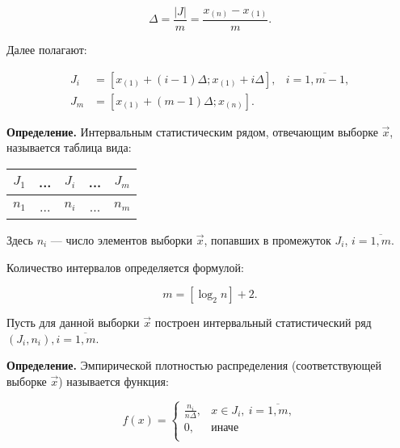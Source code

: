\begin{equation}\label{eq:06}
    \Delta = \frac{|J|}{m} = \frac{x_{(n)} - x_{(1)}}{m}.
\end{equation}

\clearpage
Далее полагают:

\begin{equation}\label{eq:07}
    \begin{aligned}
        J_i &= [x_{(1)} + (i - 1) \Delta; x_{(1)} + i \Delta],
        & i = \overline{1, m-1},\\
        J_m &= [x_{(1)} + (m - 1) \Delta; x_{(n)}].
    \end{aligned}
\end{equation}

\textbf{Определение.} Интервальным статистическим рядом, отвечающим
выборке $\vec{x}$, называется таблица вида:

\begin{table}[htb]
    \centering
    \begin{tabular}{|c|c|c|c|c|}
        \hline
        $J_1$ & ... & $J_i$ & ... & $J_m$ \\
        \hline
        $n_1$ & ... & $n_i$ & ... & $n_m$ \\
        \hline
    \end{tabular}
\end{table}

Здесь $n_i$ --- число элементов выборки $\vec{x}$, попавших в промежуток $J_i$,
$i= \overline{1,m}$.

Количество интервалов определяется формулой:

\begin{equation}\label{eq:09}
    m = [\log_2 n] + 2.
\end{equation}

Пусть для данной выборки $\vec{x}$ построен интервальный статистический
ряд~$(J_i, n_i), i=\overline{1,m}$.

\textbf{Определение.} Эмпирической плотностью распределения (соответствующей
выборке $\vec{x}$) называется функция:

\begin{equation}
    f(x) =
    \begin{cases}
        \frac{n_i}{n \Delta}, &x \in J_i,~i = \overline{1, m}, \\
        0, &\text{иначе} \\
    \end{cases}
\end{equation}

